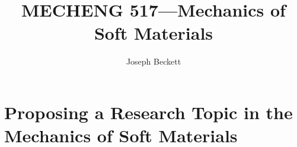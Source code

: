 \documentclass[preprint,12pt,authoryear]{elsarticle}
\begin{document}
\begin{frontmatter}

\title{MECHENG 517---Mechanics of Soft Materials} %

\author{Joseph Beckett} 










\end{frontmatter}


\section*{Proposing a Research Topic in the Mechanics of Soft Materials}
\end{document}
